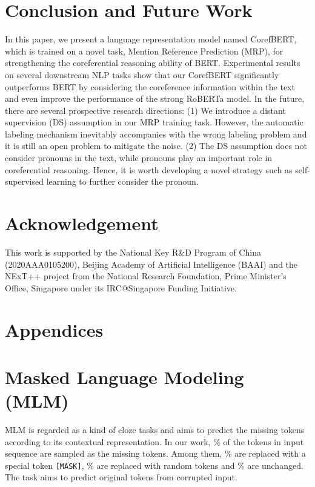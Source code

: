 \documentclass[11pt,a4paper]{article}
\newcommand\CorefBERT{CorefBERT\xspace}
\begin{document}
\section{Conclusion and Future Work}

In this paper, we present a language representation model named \CorefBERT, which is trained on a novel task, Mention Reference Prediction (MRP),  for strengthening the coreferential reasoning ability of BERT. 
Experimental results on several downstream NLP tasks show that our \CorefBERT significantly outperforms BERT by considering the coreference information within the text and even improve the performance of the strong RoBERTa model. In the future, there are several prospective research directions: (1) We introduce a distant supervision (DS) assumption in our MRP training task. However, the automatic labeling mechanism inevitably accompanies with the wrong labeling problem and it is still an open problem to mitigate the noise.
(2) The DS assumption does not consider  pronouns in the text, while  pronouns play an important role in coreferential reasoning. Hence, it is worth developing a novel strategy such as self-supervised learning to further consider the pronoun.



\section{Acknowledgement}
This work is supported by the National Key R\&D Program of China (2020AAA0105200), Beijing Academy of Artificial Intelligence (BAAI) and the NExT++ project from the National Research Foundation, Prime Minister’s Office, Singapore under its IRC@Singapore Funding Initiative.





\appendix

\section*{Appendices}
\section{Masked Language Modeling (MLM)} 
MLM is regarded as a kind of cloze tasks and aims to predict the missing tokens according to its contextual representation. In our work, \% of the tokens in  input sequence are sampled as the missing tokens. Among them, \% are replaced with a special token \texttt{[MASK]}, \% are replaced with random tokens and \% are unchanged. The task aims to predict original tokens from corrupted input.
\end{document}
